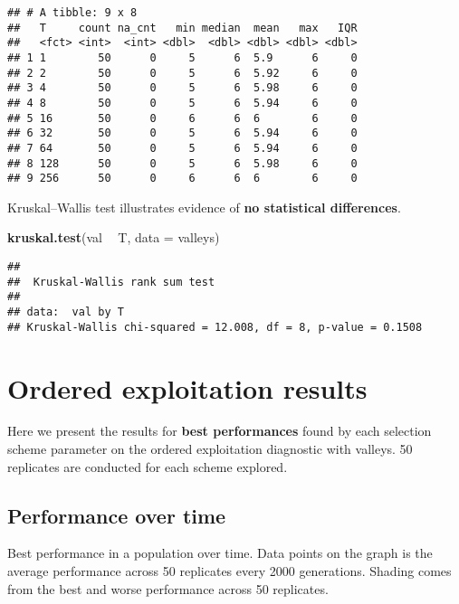 \documentclass[]{book}
\newenvironment{Shaded}{\begin{snugshade}}{\end{snugshade}}
\newcommand{\DataTypeTok}[1]{\textcolor[rgb]{0.13,0.29,0.53}{#1}}
\newcommand{\KeywordTok}[1]{\textcolor[rgb]{0.13,0.29,0.53}{\textbf{#1}}}
\newcommand{\NormalTok}[1]{#1}
\newcommand{\OperatorTok}[1]{\textcolor[rgb]{0.81,0.36,0.00}{\textbf{#1}}}
\newcommand{\StringTok}[1]{\textcolor[rgb]{0.31,0.60,0.02}{#1}}
\begin{document}
\begin{verbatim}
## # A tibble: 9 x 8
##   T     count na_cnt   min median  mean   max   IQR
##   <fct> <int>  <int> <dbl>  <dbl> <dbl> <dbl> <dbl>
## 1 1        50      0     5      6  5.9      6     0
## 2 2        50      0     5      6  5.92     6     0
## 3 4        50      0     5      6  5.98     6     0
## 4 8        50      0     5      6  5.94     6     0
## 5 16       50      0     6      6  6        6     0
## 6 32       50      0     5      6  5.94     6     0
## 7 64       50      0     5      6  5.94     6     0
## 8 128      50      0     5      6  5.98     6     0
## 9 256      50      0     6      6  6        6     0
\end{verbatim}

Kruskal--Wallis test illustrates evidence of \textbf{no statistical differences}.

\begin{Shaded}
\begin{Highlighting}[]
\KeywordTok{kruskal.test}\NormalTok{(val }\OperatorTok{~}\StringTok{ }\NormalTok{T, }\DataTypeTok{data =}\NormalTok{ valleys)}
\end{Highlighting}
\end{Shaded}

\begin{verbatim}
## 
##  Kruskal-Wallis rank sum test
## 
## data:  val by T
## Kruskal-Wallis chi-squared = 12.008, df = 8, p-value = 0.1508
\end{verbatim}

\hypertarget{ordered-exploitation-results}{%
\section{Ordered exploitation results}\label{ordered-exploitation-results}}

Here we present the results for \textbf{best performances} found by each selection scheme parameter on the ordered exploitation diagnostic with valleys.
50 replicates are conducted for each scheme explored.

\hypertarget{performance-over-time-1}{%
\subsection{Performance over time}\label{performance-over-time-1}}

Best performance in a population over time.
Data points on the graph is the average performance across 50 replicates every 2000 generations.
Shading comes from the best and worse performance across 50 replicates.
\end{document}
